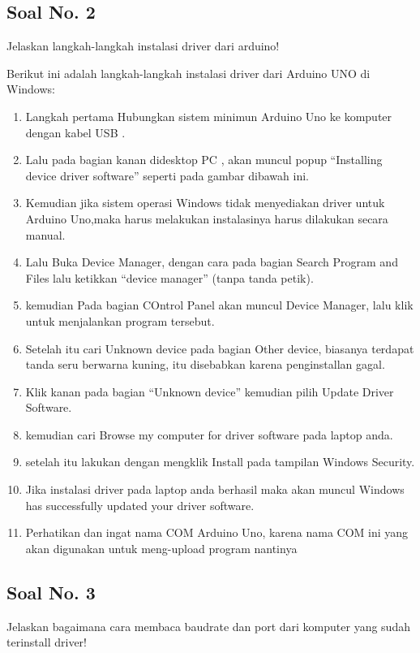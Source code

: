\subsection{Soal No. 2}
Jelaskan langkah-langkah instalasi driver dari arduino!

\hfill \break
Berikut ini adalah langkah-langkah instalasi driver dari Arduino UNO di Windows:

\begin{enumerate}
	\item Langkah pertama Hubungkan sistem minimun Arduino Uno ke komputer dengan kabel USB .
	\item Lalu pada bagian kanan didesktop PC , akan muncul popup “Installing device driver software” seperti pada gambar dibawah ini.
	\item Kemudian jika sistem  operasi Windows tidak menyediakan driver untuk Arduino Uno,maka harus  melakukan instalasinya harus dilakukan secara manual.
	\item Lalu  Buka Device Manager,  dengan cara pada bagian Search Program and Files lalu ketikkan “device manager” (tanpa tanda petik). 
	\item kemudian Pada bagian COntrol Panel akan muncul Device Manager, lalu klik untuk menjalankan program tersebut.
	\item Setelah itu cari  Unknown device pada bagian Other device, biasanya terdapat tanda seru berwarna kuning, itu disebabkan karena penginstallan gagal.
	\item Klik kanan pada bagian  “Unknown device” kemudian pilih Update Driver Software.
	\item kemudian cari Browse my computer for driver software pada laptop anda.
	\item setelah itu lakukan dengan mengklik Install pada tampilan Windows Security.
	\item Jika instalasi driver pada laptop anda berhasil maka akan muncul Windows has successfully updated your driver software.
	\item Perhatikan dan ingat nama COM Arduino Uno, karena nama COM ini yang akan digunakan untuk meng-upload program nantinya
\end{enumerate}

\subsection{Soal No. 3}
Jelaskan bagaimana cara membaca baudrate dan port dari komputer yang sudah terinstall driver!

